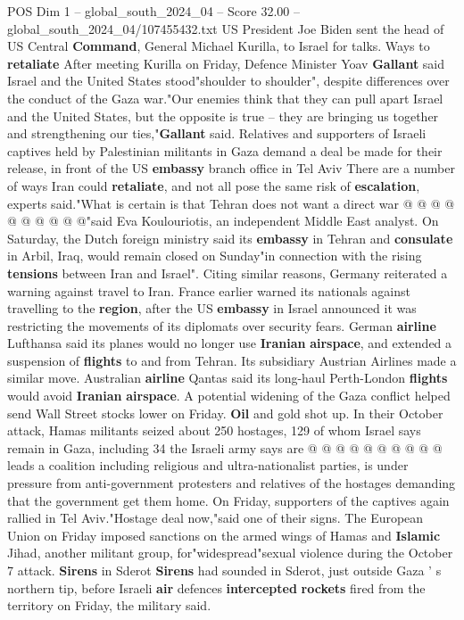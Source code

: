 \begin{textsample}{POS Dim 1 – global\_south\_2024\_04 – Score 32.00 – global\_south\_2024\_04/107455432.txt}
US President Joe Biden sent the head of US Central \textbf{Command}, General Michael Kurilla, to Israel for talks.
Ways to \textbf{retaliate} After meeting Kurilla on Friday, Defence Minister Yoav \textbf{Gallant} said Israel and the United States stood"shoulder to shoulder", despite differences over the conduct of the Gaza war."Our enemies think that they can pull apart Israel and the United States, but the opposite is true -- they are bringing us together and strengthening our ties,"\textbf{Gallant} said.
Relatives and supporters of Israeli captives held by Palestinian militants in Gaza demand a deal be made for their release, in front of the US \textbf{embassy} branch office in Tel Aviv There are a number of ways Iran could \textbf{retaliate}, and not all pose the same risk of \textbf{escalation}, experts said."What is certain is that Tehran does not want a direct war @ @ @ @ @ @ @ @ @ @"said Eva Koulouriotis, an independent Middle East analyst.
On Saturday, the Dutch foreign ministry said its \textbf{embassy} in Tehran and \textbf{consulate} in Arbil, Iraq, would remain closed on Sunday"in connection with the rising \textbf{tensions} between Iran and Israel".
Citing similar reasons, Germany reiterated a warning against travel to Iran.
France earlier warned its nationals against travelling to the \textbf{region}, after the US \textbf{embassy} in Israel announced it was restricting the movements of its diplomats over security fears.
German \textbf{airline} Lufthansa said its planes would no longer use \textbf{Iranian} \textbf{airspace}, and extended a suspension of \textbf{flights} to and from Tehran.
Its subsidiary Austrian Airlines made a similar move.
Australian \textbf{airline} Qantas said its long-haul Perth-London \textbf{flights} would avoid \textbf{Iranian} \textbf{airspace}.
A potential widening of the Gaza conflict helped send Wall Street stocks lower on Friday. \textbf{Oil} and gold shot up.
In their October attack, Hamas militants seized about 250 hostages, 129 of whom Israel says remain in Gaza, including 34 the Israeli army says are @ @ @ @ @ @ @ @ @ @ leads a coalition including religious and ultra-nationalist parties, is under pressure from anti-government protesters and relatives of the hostages demanding that the government get them home.
On Friday, supporters of the captives again rallied in Tel Aviv."Hostage deal now,"said one of their signs.
The European Union on Friday imposed sanctions on the armed wings of Hamas and \textbf{Islamic} Jihad, another militant group, for"widespread"sexual violence during the October 7 attack. \textbf{Sirens} in Sderot \textbf{Sirens} had sounded in Sderot, just outside Gaza ' s northern tip, before Israeli \textbf{air} defences \textbf{intercepted} \textbf{rockets} fired from the territory on Friday, the military said.

\end{textsample}
